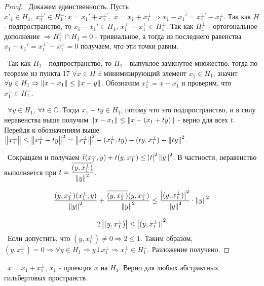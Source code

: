 \begin{proof}
\smallskip
\par\noindent \textbullet~Докажем единственность. Пусть $x'_1 \in H_1, \; x_1^{\bot'} \in H_1^\bot : x = x_1' + x_1^{\bot'}, \; x = x_1 + x_1^\bot \Rightarrow
x_1 - x_1' = x_1^{\bot'} - x_1^\bot$. Так как $H$ - подпространство, то $x_1 - x_1' \in H_1$, $x_1^{\bot'} - x_1^{\bot} \in H_1^\bot$. Так как $H_1^\bot$ - 
ортогональное дополнение $\Rightarrow H_1^\bot \cap H_1 = {0}$ - тривиальное, а тогда из последнего равенства $x_1 - x_1' = x_1^{\bot'} - x_1^\bot = 0$ получаем, что 
эти точки равны. 

\medskip 
\noindent \textbullet~Так как $H_1$ - подпространство, то $H_1$ - выпуклое замкнутое множество, тогда по теореме из пункта 17 $\forall x \in H \; \exists$ минимизирующий
элемент $x_1 \in H_1$, значит $\forall y \in H_1 \Rightarrow \left\lVert x - x_1\right\rVert \le \left\lVert x - y\right\rVert$. Обозначим $x_1^\bot = x - x_1$ и проверим, что $x_1^\bot \in H_1^\bot$. 

\smallskip
\noindent \textbullet~$\forall y \in H_1$, $\forall t \in \mathbb{C}$. Тогда $x_1 + t y \in H_1$, потому что это подпространство, и в силу неравенства выше получим 
$\left\lVert x - x_1\right\rVert \le \left\lVert x - (x_1 + t y)\right\rVert$ - верно для всех $t$. Перейдя к обозначениям выше $\left\lVert x_1^\bot\right\rVert \le \left\lVert x_1^\bot - t y\right\rVert^2 = \left\lVert x_1^\bot\right\rVert^2 - 
(x_1^\bot, ty) - (ty, x_1^\bot) + \left\lVert t y\right\rVert^2$.

\smallskip
\noindent \textbullet~Сокращаем и получаем $\overline{t} (x_1^\bot, y) + t (y, x_1^\bot) \le \left\lvert t\right\rvert^2 \left\lVert y\right\rVert^2$. В частности, неравенство выполняется при 
$t = \dfrac{\overline{(y, x_1^\bot)}}{\left\lVert y\right\rVert^2}$.

\[
    \dfrac{(y, x_1^\bot)(x_1^\bot, y)}{\left\lVert y\right\rVert^2} + \dfrac{\overline{(y, x_1^\bot)}(y, x_1^\bot)}{\left\lVert y\right\rVert^2} \le \dfrac{\left\lvert(y, x_1^\bot)\right\rvert^2}{\left\lVert y\right\rVert^4} \cdot 
    \left\lVert y\right\rVert^2
\]

\[
    2 \left\lvert(y, x_1^\bot)\right\rvert \le \left\lvert(y, x_1^\bot)\right\rvert^2
\]
\noindent \textbullet~Если допустить, что $(y, x_1^\bot) \neq 0 \Rightarrow 2 \le 1$. Таким образом, $(y, x_1^\bot) = 0 \Rightarrow \forall y \in H_1 \Rightarrow 
y \bot x_1^\bot \Rightarrow x_1^\bot \in H_1^\bot$. Разложение получено.
\end{proof}

\bigskip
\noindent \textasteriskcentered~$x = x_1 + x_1^\bot$, $x_1$ - проекция $x$ на $H_1$. Верно для любых абстрактных гильбертовых пространств.



